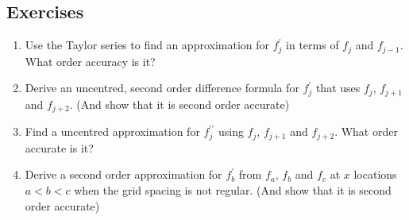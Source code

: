 {{}}\clearpage{}

\clearpage{}


\subsection{Exercises}
\begin{enumerate}
\item Use the Taylor series to find an approximation for $f_{j}^{\prime}$
in terms of $f_{j}$ and $f_{j-1}$. What order accuracy is it?\vfill{}

\item Derive an uncentred, second order difference formula for $f_{j}^{\prime}$
that uses $f_{j}$, $f_{j+1}$ and $f_{j+2}$. (And show that it is
second order accurate) \vfill{}

\item Find a uncentred approximation for $f_{j}^{\prime\prime}$ using $f_{j}$,
$f_{j+1}$ and $f_{j+2}$. What order accurate is it? 
\item Derive a second order approximation for $f_{b}^{\prime}$ from $f_{a}$,
$f_{b}$ and $f_{c}$ at $x$ locations $a<b<c$ when the grid spacing
is not regular. (And show that it is second order accurate) 
\end{enumerate}
\clearpage{}

